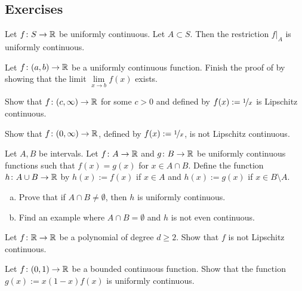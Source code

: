 \subsection{Exercises}

\begin{exercise}
Let $f \colon S \to {\mathbb{R}}$ be uniformly continuous.  Let $A \subset S$.
Then the restriction $f|_A$ is uniformly continuous.
\end{exercise}

\begin{exercise}
Let $f \colon (a,b) \to {\mathbb{R}}$ be a uniformly continuous function.
Finish the proof of  by showing that
the limit
$\lim\limits_{x \to b} f(x)$
exists.
\end{exercise}

\begin{exercise}
Show that $f \colon (c,\infty) \to {\mathbb{R}}$ for some $c > 0$
and defined by $f(x) := \nicefrac{1}{x}$ is Lipschitz continuous.
\end{exercise}

\begin{exercise}
Show that $f \colon (0,\infty) \to {\mathbb{R}}$,
defined by $f(x) := \nicefrac{1}{x}$, is not Lipschitz continuous.
\end{exercise}

\begin{samepage}
\begin{exercise}
Let $A, B$ be intervals.
Let $f \colon A \to {\mathbb{R}}$ and $g \colon B \to {\mathbb{R}}$ be uniformly continuous
functions such that $f(x) = g(x)$ for $x \in A \cap B$.  Define
the function $h \colon A \cup B \to {\mathbb{R}}$ by $h(x) := f(x)$ if
$x \in A$ and $h(x) := g(x)$ if $x \in B \setminus A$.
\begin{enumerate}[a)]
\item
Prove that if $A \cap B \not= \emptyset$, then $h$ is uniformly continuous.
\item
Find an example where $A \cap B = \emptyset$ and $h$ is not even
continuous.
\end{enumerate}
\end{exercise}
\end{samepage}

\begin{exercise}[Challenging]
Let $f \colon {\mathbb{R}} \to {\mathbb{R}}$ be a polynomial of degree 
$d \geq 2$.  Show that $f$ is not Lipschitz
continuous.
\end{exercise}

\begin{exercise}
Let $f \colon (0,1) \to {\mathbb{R}}$ be a bounded continuous function.  Show that
the function
$g(x) := x(1-x)f(x)$ is uniformly continuous.
\end{exercise}

